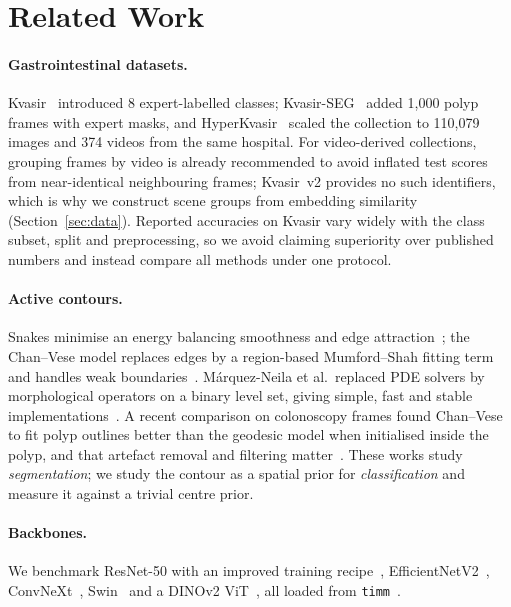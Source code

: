\section{Related Work}
\paragraph{Gastrointestinal datasets.}
Kvasir~\cite{pogorelov2017kvasir} introduced 8 expert-labelled classes; Kvasir-SEG~\cite{jha2020kvasirseg} added 1{,}000
polyp frames with expert masks, and HyperKvasir~\cite{borgli2020hyperkvasir} scaled the collection to 110{,}079 images
and 374 videos from the same hospital. For video-derived collections, grouping frames by video is already
recommended to avoid inflated test scores from near-identical neighbouring frames; Kvasir~v2 provides no such
identifiers, which is why we construct scene groups from embedding similarity (Section~\ref{sec:data}).
Reported accuracies on Kvasir vary widely with the class subset, split and preprocessing, so we avoid claiming
superiority over published numbers and instead compare all methods under one protocol.

\paragraph{Active contours.}
Snakes minimise an energy balancing smoothness and edge attraction~\cite{kass1988snakes}; the Chan--Vese model
replaces edges by a region-based Mumford--Shah fitting term and handles weak boundaries~\cite{chan2001active}.
M\'arquez-Neila et al.\ replaced PDE solvers by morphological operators on a binary level set, giving
simple, fast and stable implementations~\cite{marquezneila2014morphological}. A recent comparison on colonoscopy
frames found Chan--Vese to fit polyp outlines better than the geodesic model when initialised inside the
polyp, and that artefact removal and filtering matter~\cite{ismail2022ways}. These works study
\emph{segmentation}; we study the contour as a spatial prior for \emph{classification} and measure it against a
trivial centre prior.

\paragraph{Backbones.}
We benchmark ResNet-50 with an improved training recipe~\cite{he2016resnet,wightman2021resnet},
EfficientNetV2~\cite{tan2021efficientnetv2}, ConvNeXt~\cite{liu2022convnext}, Swin~\cite{liu2021swin} and a
DINOv2 ViT~\cite{oquab2024dinov2}, all loaded from \texttt{timm}~\cite{wightman2019timm}.

